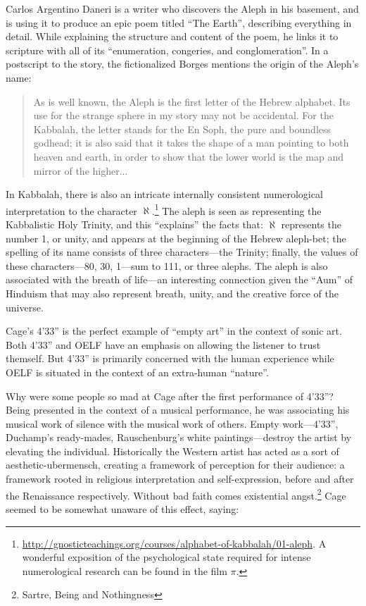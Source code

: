 \documentclass{thesis}
\begin{document}
	Carlos Argentino Daneri is a writer who discovers the Aleph in his basement, and is using it to produce an epic poem titled ``The Earth'', describing everything in detail. While explaining the structure and content of the poem, he links it to scripture with all of its ``enumeration, congeries, and conglomeration''. In a postscript to the story, the fictionalized Borges mentions the origin of the Aleph's name:
	
	\begin{quote}
	As is well known, the Aleph is the first letter of the Hebrew alphabet. Its use for the strange sphere in my story may not be accidental. For the Kabbalah, the letter stands for the En Soph, the pure and boundless godhead; it is also said that it takes the shape of a man pointing to both heaven and earth, in order to show that the lower world is the map and mirror of the higher...
	\end{quote}
	
	In Kabbalah, there is also an intricate internally consistent numerological interpretation to the character $\aleph$.\footnote{\url{http://gnosticteachings.org/courses/alphabet-of-kabbalah/01-aleph}. A wonderful exposition of the psychological state required for intense numerological research can be found in the film $\pi$.} The aleph is seen as representing the Kabbalistic Holy Trinity, and this ``explains'' the facts that: $\aleph$ represents the number 1, or unity, and appears at the beginning of the Hebrew aleph-bet; the spelling of its name consists of three characters---the Trinity; finally, the values of these characters---80, 30, 1---sum to 111, or three alephs. The aleph is also associated with the breath of life---an interesting connection given the ``Aum'' of Hinduism that may also represent breath, unity, and the creative force of the universe.
	
	Cage's 4'33'' is the perfect example of ``empty art'' in the context of sonic art.\cite{larry_j_solomon_sounds_1998} Both 4'33'' and OELF have an emphasis on allowing the listener to trust themself. But 4'33'' is primarily concerned with the human experience while OELF is situated in the context of an extra-human ``nature''.
	
	Why were some people so mad at Cage after the first performance of 4'33''? Being presented in the context of a musical performance, he was associating his musical work of silence with the musical work of others. Empty work---4'33'', Duchamp's ready-mades, Rauschenburg's white paintings---destroy the artist by elevating the individual. Historically the Western artist has acted as a sort of aesthetic-ubermensch, creating a framework of perception for their audience: a framework rooted in religious interpretation and self-expression, before and after the Renaissance respectively. Without bad faith comes existential angst.\footnote{Sartre, Being and Nothingness} Cage seemed to be somewhat unaware of this effect, saying:
	
\end{document}

